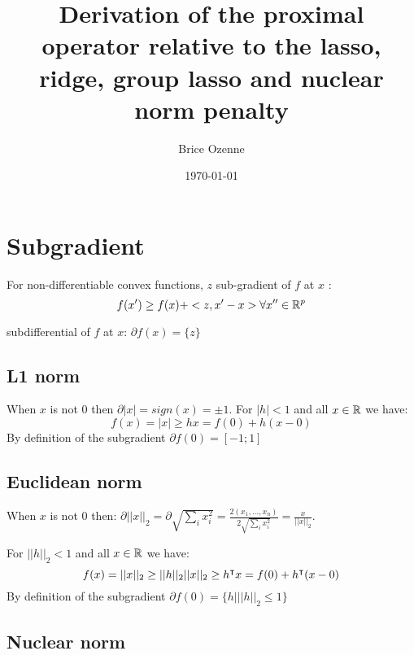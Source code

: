 \documentclass{article}
\author{Brice Ozenne}
\date{\today}
\title{Derivation of the proximal operator relative to the lasso, ridge, group lasso and nuclear norm penalty}
\begin{document}
\maketitle

\tableofcontents

\clearpage

\section{Subgradient}
\label{sec:org3cb9764}
For non-differentiable convex functions, $ z $ sub-gradient of $ f $ at $ x $ :
\[ f(x') \geq f(x) + <z,x'-x>  \forall x'' \in \mathbb{R}^p\]
	
subdifferential of $ f $ at $ x $: $ \partial f (x) = \{z\} $


\subsection{L1 norm}
\label{sec:org615ea4a}

When $ x $ is not $ 0 $ then $ \partial |x| = sign(x) = \pm 1 $. For $ |h|<1 $ and all $ x \in \mathbb{R}$ we have:
\[ f(x) = |x| \geq h x = f(0) + h (x-0) \]
By definition of the subgradient $ \partial f(0) = [-1;1] $

\subsection{Euclidean norm}
\label{sec:org7754336}
When $ x $ is not $ 0 $ then: $ \partial ||x||_2 = \partial  \sqrt{\sum_i x_i^2} =  \frac{2 (x_1,\ldots,x_n)}{2 \sqrt{\sum_i x_i^2}} = \frac{x}{||x||_2}$.

For $ ||h||_2<1 $ and all $ x \in \mathbb{R}$ we have:
\[ f(x) = ||x||_2 \geq ||h||_2 ||x||_2 \geq {h}^\intercal x = f(0) + {h}^\intercal (x-0) \]
By definition of the subgradient $ \partial f(0) = \{h| ||h||_2\leq1\} $

\subsection{Nuclear norm}
\label{sec:orgc2478e1}
\end{document}

